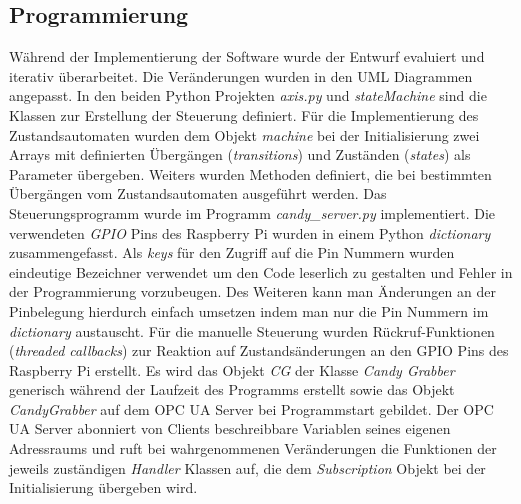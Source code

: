 \documentclass[BMR,Bachelor,ngerman]{twbook}%
\begin{document}
\subsection{Programmierung}
Während der Implementierung der Software wurde der Entwurf evaluiert und iterativ überarbeitet. Die Veränderungen wurden in den UML Diagrammen angepasst. In den beiden Python Projekten \emph{axis.py} und \emph{stateMachine} sind die Klassen zur Erstellung der Steuerung definiert. Für die Implementierung des Zustandsautomaten wurden dem Objekt \emph{machine} bei der Initialisierung zwei Arrays mit definierten Übergängen (\emph{transitions}) und Zuständen (\emph{states}) als Parameter übergeben. Weiters wurden Methoden definiert, die bei bestimmten Übergängen vom Zustandsautomaten ausgeführt werden. Das Steuerungsprogramm wurde im Programm \emph{candy\_server.py} implementiert. Die verwendeten \emph{GPIO} Pins des Raspberry Pi wurden in einem Python \emph{dictionary} zusammengefasst. Als \emph{keys} für den Zugriff auf die Pin Nummern wurden eindeutige Bezeichner verwendet um den Code leserlich zu gestalten und Fehler in der Programmierung vorzubeugen. Des Weiteren kann man Änderungen an der Pinbelegung hierdurch einfach umsetzen indem man nur die Pin Nummern im \emph{dictionary} austauscht. Für die manuelle Steuerung wurden Rückruf-Funktionen (\emph{threaded callbacks}) zur Reaktion auf Zustandsänderungen an den \ac{GPIO} Pins des Raspberry Pi erstellt. Es wird das Objekt \emph{CG} der Klasse \emph{Candy Grabber} generisch während der Laufzeit des Programms erstellt sowie das Objekt \emph{CandyGrabber} auf dem \ac{OPC UA} Server bei Programmstart gebildet. Der \ac{OPC UA} Server abonniert von Clients beschreibbare Variablen seines eigenen Adressraums und ruft bei wahrgenommenen Veränderungen die Funktionen der jeweils zuständigen \emph{Handler} Klassen auf, die dem \emph{Subscription} Objekt bei der Initialisierung übergeben wird.
\end{document}
